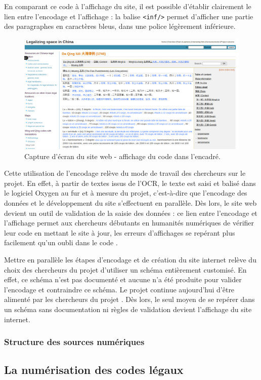 En comparant ce code \XML à l'affichage du site, il est possible d'établir clairement le lien entre l'encodage et l'affichage : la balise \texttt{<inf/>} permet d'afficher une partie des paragraphes en caractères bleus, dans une police légèrement inférieure. 
\begin{figure}[h]
    \centering
    \includegraphics[width=\textwidth]{images/image1.png}
    \caption{Capture d'écran du site web \LSC - affichage du code \XML dans l'encadré.}
    \label{Capture d'écran du site web \LSC}
\end{figure}

Cette utilisation de l'encodage relève du mode de travail des chercheurs sur le projet. En effet, à partir de textes issus de l'OCR, le texte est saisi et balisé dans le logiciel Oxygen au fur et à mesure du projet, c'est-à-dire que l'encodage des données et le développement du site s'effectuent en parallèle. Dès lors, le site web devient un outil de validation de la saisie des données : ce lien entre l'encodage et l'affichage permet aux chercheurs débutants en humanités numériques de vérifier leur code en mettant le site à jour, les erreurs d'affichages se repérant plus facilement qu'un oubli dans le code \XML. 

Mettre en parallèle les étapes d'encodage et de création du site internet relève du choix des chercheurs du projet d'utiliser un schéma \XML entièrement customisé. En effet, ce schéma n'est pas documenté et aucune \DTD n'a été produite pour valider l'encodage et contraindre ce schéma. Le projet \LSC continue aujourd'hui d'être alimenté par les chercheurs du projet \COREL. Dès lors, le seul moyen de se repérer dans un schéma sans documentation ni règles de validation devient l'affichage du site internet.

\subsubsection{Structure des sources numériques}

\subsection{La numérisation des codes légaux}

